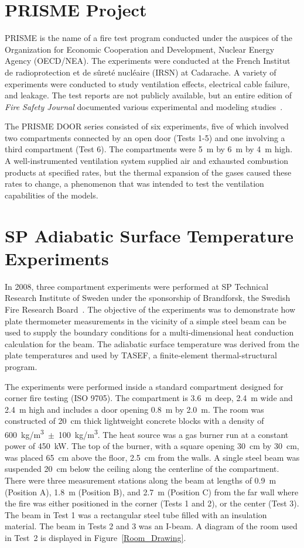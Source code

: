 \FloatBarrier

\section{PRISME Project}

PRISME is the name of a fire test program conducted under the auspices of the Organization for Economic Cooperation and Development, Nuclear Energy Agency (OECD/NEA). The experiments were conducted at the French Institut de radioprotection et de s\^{u}ret\'{e} nucl\'{e}aire (IRSN) at Cadarache. A variety of experiments were conducted to study ventilation effects, electrical cable failure, and leakage. The test reports are not publicly available, but an entire edition of {\em Fire Safety Journal} documented various experimental and modeling studies~\cite{Audouin:FSJ}.

The PRISME DOOR series consisted of six experiments, five of which involved two compartments connected by an open door (Tests 1-5) and one involving a third compartment (Test 6). The compartments were 5~m by 6~m by 4~m high. A well-instrumented ventilation system supplied air and exhausted combustion products at specified rates, but the thermal expansion of the gases caused these rates to change, a phenomenon that was intended to test the ventilation capabilities of the models.

\section{SP Adiabatic Surface Temperature Experiments}

In 2008, three compartment experiments were performed at SP Technical Research Institute of Sweden under the sponsorship of Brandforsk, the Swedish Fire Research Board~\cite{Wickstrom_AST}. The objective of the experiments was to demonstrate how plate thermometer measurements in the vicinity of a simple steel beam can be used to supply the boundary conditions for a multi-dimensional heat conduction calculation for the beam. The adiabatic surface temperature was derived from the plate temperatures and used by TASEF, a finite-element
thermal-structural program.

The experiments were performed inside a standard compartment designed for corner fire testing (ISO 9705). The compartment is 3.6~m deep, 2.4~m wide and 2.4~m high and includes a door opening 0.8~m by 2.0~m. The room was constructed of 20~cm thick lightweight concrete blocks with a density of 600~\unit{kg/m^3}~$\pm$~100~\unit{kg/m^3}. The heat source was a gas burner run at a constant power of 450~kW. The top of the burner, with a square opening 30~cm by 30~cm, was placed 65~cm above the floor, 2.5~cm from the walls. A single steel beam was suspended 20~cm below the ceiling along the centerline of the compartment. There were three measurement stations along the beam at lengths of 0.9~m (Position A), 1.8~m (Position B), and 2.7~m (Position C) from the far wall where the fire was either positioned in the corner (Tests 1 and 2), or the center (Test 3). The beam in Test 1 was a rectangular steel tube filled with an insulation material. The beam in Tests 2 and 3 was an I-beam.  A diagram of the room used in Test~2 is displayed in Figure~\ref{Room_Drawing}.

